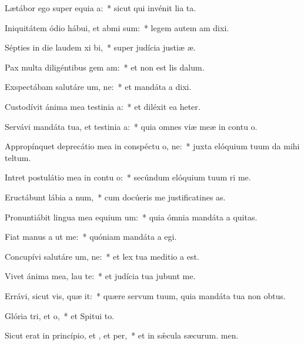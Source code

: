 \item Lætábor ego super equia a:~* sicut qui invénit lia ta.
\item Iniquitátem ódio hábui, et abmi sum:~* legem autem am dixi.
\item Sépties in die laudem xi bi,~* super judícia justiæ æ.
\item Pax multa diligéntibus gem am:~* et non est lis dalum.
\item Exspectábam salutáre um, ne:~* et mandáta a dixi.
\item Custodívit ánima mea testinia a:~* et diléxit ea heter.
\item Servávi mandáta tua, et testinia a:~* quia omnes viæ meæ in contu o.
\item Appropínquet deprecátio mea in conspéctu o, ne:~* juxta elóquium tuum da mihi teltum.
\item Intret postulátio mea in contu o:~* secúndum elóquium tuum ri me.
\item Eructábunt lábia a num,~* cum docúeris me justificatines as.
\item Pronuntiábit lingua mea equium um:~* quia ómnia mandáta a quitas.
\item Fiat manus a ut  me:~* quóniam mandáta a egi.
\item Concupívi salutáre um, ne:~* et lex tua meditio a est.
\item Vivet ánima mea,  lau te:~* et judícia tua jubunt me.
\item Errávi, sicut vis, quæ it:~* quære servum tuum, quia mandáta tua non  obtus.
\item Glória tri, et o,~* et Spitui to.
\item Sicut erat in princípio, et , et per,~* et in sǽcula sæcurum. men.
